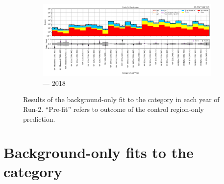 \begin{figure}[htbp]
    \begin{subfigure}[b]{0.9\textwidth}
        \includegraphics[width=\textwidth]{chapters/higgstoinv/figures/mountain_ranges/2018/ttH/SR_tree_fit_b-abs_values_ttH_cats.pdf}
        \caption{\ttH --- 2018}
    \end{subfigure}
    \caption[Results of the background-only fit to the \ttH category in each year of Run-2]{Results of the background-only fit to the \ttH category in each year of Run-2. ``Pre-fit'' refers to outcome of the control region-only prediction.}
    \label{fig:htoinv_mountain_range_B_only_ttH_SR}
\end{figure}

\clearpage




\section{Background-only fits to the \texorpdfstring{\VH}{VH} category}
\label{sec:B_only_fit_plots_VH_SR}

